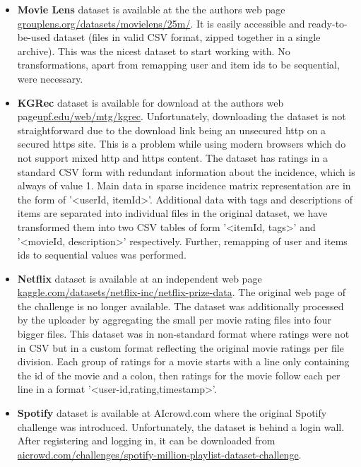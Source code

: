 \begin{itemize}
    \item \textbf{Movie Lens} dataset is available at the the authors web page \newline \href{https://grouplens.org/datasets/movielens/25m/}{grouplens.org/datasets/movielens/25m/}. It is easily accessible and ready-to-be-used dataset (files in valid CSV format, zipped together in a single archive). This was the nicest dataset to start working with. No transformations, apart from remapping user and item ids to be sequential, were necessary.
    
    \item \textbf{KGRec} dataset is available for download at the authors web page\newline \href{https://www.upf.edu/web/mtg/kgrec}{upf.edu/web/mtg/kgrec}. Unfortunately, downloading the dataset is not straightforward due to the download link being an unsecured http on a secured https site. This is a problem while using modern browsers which do not support mixed http and https content. The dataset has ratings in a standard CSV form with redundant information about the incidence, which is always of value 1. Main data in sparse incidence matrix representation are in the form of '\textless userId, itemId\textgreater'. Additional data with tags and descriptions of items are separated into individual files in the original dataset, we have transformed them into two CSV tables of form '\textless itemId, tags\textgreater' and '\textless movieId, description\textgreater' respectively. Further, remapping of user and items ids to sequential values was performed.
    \item \textbf{Netflix} dataset is available at an independent web page
    \newline
    \href{https://www.kaggle.com/datasets/netflix-inc/netflix-prize-data}{kaggle.com/datasets/netflix-inc/netflix-prize-data}.
    The original web page of the challenge is no longer available. The dataset was additionally processed by the uploader by aggregating the small per movie rating files into four bigger files. This dataset was in non-standard format where ratings were not in CSV but in a custom format reflecting the original movie ratings per file division. Each group of ratings for a movie starts with a line only containing the id of the movie and a colon, then ratings for the movie follow each per line in a format '\textless user-id,rating,timestamp\textgreater'.
    
    \item \textbf{Spotify} dataset is available at AIcrowd.com where the original Spotify challenge was introduced. Unfortunately, the dataset is behind a login wall. After registering and logging in, it can be downloaded from \newline\href{https://www.aicrowd.com/challenges/spotify-million-playlist-dataset-challenge}{aicrowd.com/challenges/spotify-million-playlist-dataset-challenge}.
    \newline
    

\end{itemize}
